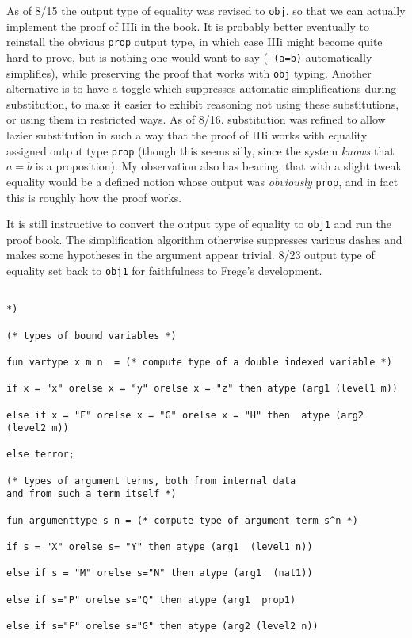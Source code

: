 \documentclass{article}
\begin{document}
{{As of 8/15 the output type of equality was revised to {\tt obj}, so that we can actually implement the proof of IIIi in the book.  It is probably better eventually to reinstall the
obvious {\tt prop} output type, in which case IIIi might become quite hard to prove, but is nothing one would want to say ({\tt --(a=b)} automatically simplifies), while preserving the proof that works with
{\tt obj} typing.  Another alternative is to have a toggle which suppresses automatic simplifications during substitution, to make it easier to exhibit reasoning not using these substitutions, or using them in restricted ways.   As of 8/16. substitution was refined to allow lazier substitution in such a way that the proof of IIIi works with equality assigned output type {\tt prop} (though this seems silly, since the system {\em knows} that $a=b$ is a proposition).  My observation also has bearing,  that with a slight tweak equality would be a defined notion whose output was {\em obviously\/} {\tt prop}, and in fact this is roughly how the proof works.

It is still instructive to convert the output type of equality to {\tt obj1} and run the proof book.  The simplification algorithm otherwise suppresses various dashes and makes some hypotheses in the argument appear trivial.  8/23 output type of equality set back to {\tt obj1} for faithfulness to Frege's development.

\begin{verbatim}

*)

(* types of bound variables *)

fun vartype x m n  = (* compute type of a double indexed variable *)

if x = "x" orelse x = "y" orelse x = "z" then atype (arg1 (level1 m))

else if x = "F" orelse x = "G" orelse x = "H" then  atype (arg2  (level2 m))

else terror;

(* types of argument terms, both from internal data
and from such a term itself *)

fun argumenttype s n = (* compute type of argument term s^n *)

if s = "X" orelse s= "Y" then atype (arg1  (level1 n))

else if s = "M" orelse s="N" then atype (arg1  (nat1))

else if s="P" orelse s="Q" then atype (arg1  prop1)

else if s="F" orelse s="G" then atype (arg2 (level2 n))


\end{verbatim}}}
\end{document}
